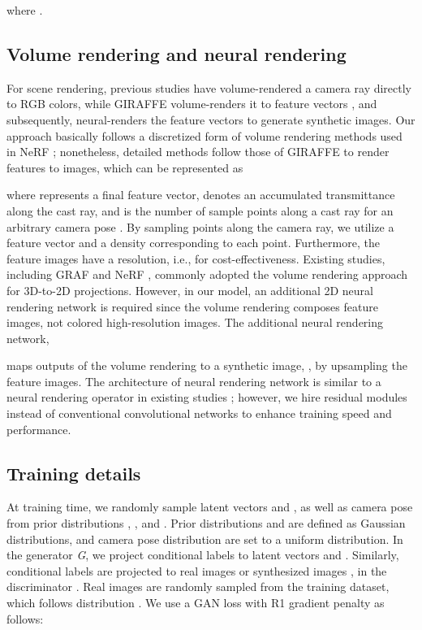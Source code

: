 \documentclass[nohyperref]{article}
\theoremstyle{plain}
\theoremstyle{definition}
\theoremstyle{remark}
\begin{document}
where .


\subsection{Volume rendering and neural rendering}
For scene rendering, previous studies \cite{schwarz2020graf} have volume-rendered a camera ray  directly to RGB colors, while GIRAFFE volume-renders it to feature vectors \cite{niemeyer2021giraffe}, and subsequently, neural-renders the feature vectors to generate synthetic images. Our approach basically follows a discretized form of volume rendering methods used in NeRF \cite{mildenhall2021nerf}; nonetheless, detailed methods follow those of GIRAFFE to render features to images, which can be represented as

where  represents a final feature vector,  denotes an accumulated transmittance along the cast ray, and  is the number of sample points along a cast ray for an arbitrary camera pose . By sampling points along the camera ray, we utilize a feature vector  and a density  corresponding to each point. Furthermore, the feature images have a  resolution, i.e.,  for cost-effectiveness.
Existing studies, including GRAF and NeRF \cite{schwarz2020graf, mildenhall2021nerf}, commonly adopted the volume rendering approach for 3D-to-2D projections. However, in our model, an additional 2D neural rendering network is required since the volume rendering composes feature images, not colored high-resolution images. The additional neural rendering network,

maps outputs of the volume rendering to a synthetic image, , by upsampling the feature images. The architecture of neural rendering network is similar to a neural rendering operator in existing studies \cite{niemeyer2021giraffe}; however, we hire residual modules instead of conventional convolutional networks to enhance training speed and performance.

\subsection{Training details}
At training time, we randomly sample latent vectors  and , as well as camera pose  from prior distributions , , and . Prior distributions  and  are defined as Gaussian distributions, and camera pose distribution  are set to a uniform distribution. In the generator \textit{G}, we project conditional labels to latent vectors \cite{cgan_proj}  and . Similarly, conditional labels are projected to real images  or synthesized images , in the discriminator . Real images  are randomly sampled from the training dataset, which follows distribution . We use a GAN loss with R1 gradient penalty \cite{mescheder2018training} as follows:
\end{document}
